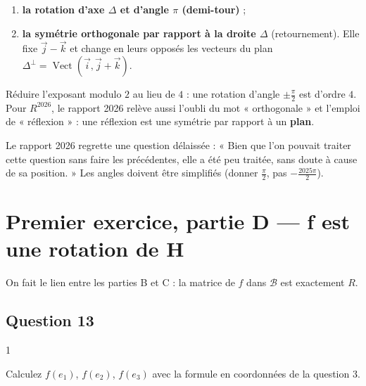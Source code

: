 \documentclass[11pt,a4paper]{article}
\providecommand{\tightlist}{\setlength{\itemsep}{0pt}\setlength{\parskip}{0pt}}
\begin{document}
\begin{enumerate}
\def\labelenumi{\arabic{enumi}.}
\tightlist
\item
  \textbf{la rotation d'axe \(\Delta\) et d'angle \(\pi\) (demi-tour)} ;
\item
  \textbf{la symétrie orthogonale par rapport à la droite \(\Delta\)} (retournement). Elle fixe \(\vec j-\vec k\) et change en leurs opposés les vecteurs du plan \(\Delta^\perp=\operatorname{Vect}(\vec i,\vec j+\vec k)\).
\end{enumerate}

\begin{piege}

Réduire l'exposant modulo \(2\) au lieu de \(4\) : une rotation d'angle \(\pm\frac\pi2\) est d'ordre \(4\). Pour \(R^{2026}\), le rapport 2026 relève aussi l'oubli du mot « orthogonale » et l'emploi de « réflexion » : une réflexion est une symétrie par rapport à un \textbf{plan}.

\end{piege}

\begin{jury}

Le rapport 2026 regrette une question délaissée : « Bien que l'on pouvait traiter cette question sans faire les précédentes, elle a été peu traitée, sans doute à cause de sa position. » Les angles doivent être simplifiés (donner \(\frac\pi2\), pas \(-\frac{2025\pi}2\)).

\end{jury}

\hypertarget{premier-exercice-partie-d-f-est-une-rotation-de-h}{%
\section{Premier exercice, partie D --- f est une rotation de H}\label{premier-exercice-partie-d-f-est-une-rotation-de-h}}

On fait le lien entre les parties B et C : la matrice de \(f\) dans \(\mathcal{B}\) est exactement \(R\).

\hypertarget{question-13}{%
\subsection{Question 13}\label{question-13}}

\begin{indication}{1}

Calculez \(f(e_1)\), \(f(e_2)\), \(f(e_3)\) avec la formule en coordonnées de la question 3.

\end{indication}
\end{document}

